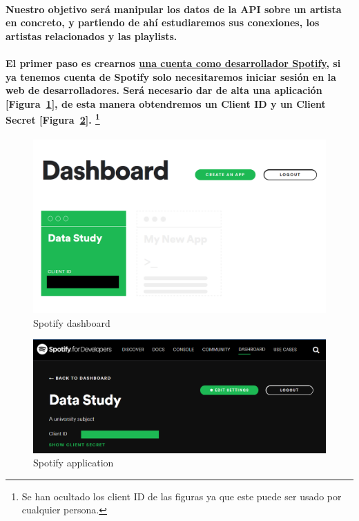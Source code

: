 \documentclass[11pt,spanish]{article}
\begin{document}
\paragraph*{Nuestro objetivo será manipular los datos de la API sobre un artista en concreto, y partiendo de ahí estudiaremos sus conexiones, los artistas relacionados y las playlists.}

\paragraph*{El primer paso es crearnos \href{https://developer.spotify.com/dashboard/applications}{una cuenta como desarrollador Spotify}, 
	si ya tenemos cuenta de Spotify solo necesitaremos iniciar sesión en la web de desarrolladores. Será necesario dar de alta una aplicación [Figura~\ref{fig:dashboard_spotify}], de esta manera obtendremos un Client ID y un Client Secret [Figura~\ref{fig:app_spotify}].
	\footnote{Se han ocultado los client ID de las figuras ya que este puede ser usado por cualquier persona.}}

\begin{figure}[h!]
    \centering
    \includegraphics[width=120mm]{spotify_dev_dashboard.png}
    \caption{Spotify dashboard}\label{fig:dashboard_spotify}
\end{figure}

\begin{figure}[h!]
    \centering
	\includegraphics[width=120mm]{devoloper_spotify_1.png}
    \caption{Spotify application}\label{fig:app_spotify}
\end{figure}
\end{document}
